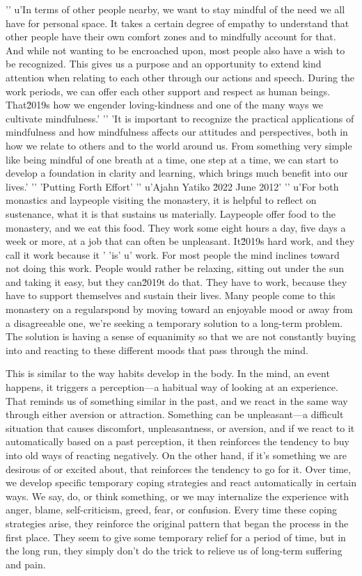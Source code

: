 '\n'
u'In terms of other people nearby, we want to stay mindful of the need we all have for personal space. It takes a certain degree of empathy to understand that other people have their own comfort zones and to mindfully account for that. And while not wanting to be encroached upon, most people also have a wish to be recognized. This gives us a purpose and an opportunity to extend kind attention when relating to each other through our actions and speech. During the work periods, we can offer each other support and respect as human beings. That\u2019s how we engender loving-kindness and one of the many ways we cultivate mindfulness.'
'\n'
'It is important to recognize the practical applications of mindfulness and how mindfulness affects our attitudes and perspectives, both in how we relate to others and to the world around us. From something very simple like being mindful of one breath at a time, one step at a time, we can start to develop a foundation in clarity and learning, which brings much benefit into our lives.'
'\n'
'Putting Forth Effort'
'\n'
u'Ajahn Yatiko \u2022 June 2012'
'\n'
u'For both monastics and laypeople visiting the monastery, it is helpful to reflect on sustenance, what it is that sustains us materially. Laypeople offer food to the monastery, and we eat this food. They work some eight hours a day, five days a week or more, at a job that can often be unpleasant. It\u2019s hard work, and they call it work because it '
'is'
u' work. For most people the mind inclines toward not doing this work. People would rather be relaxing, sitting out under the sun and taking it easy, but they can\u2019t do that. They have to work, because they have to support themselves and sustain their lives. Many people come to this monastery on a regularspond by 
moving toward an enjoyable mood or away from a disagreeable one, we're 
seeking a temporary solution to a long-term problem. The solution is 
having a sense of equanimity so that we are not constantly buying into 
and reacting to these different moods that pass through the mind.

This is similar to the way habits develop in the body. In the mind, an 
event happens, it triggers a perception---a habitual way of looking at 
an experience. That reminds us of something similar in the past, and we 
react in the same way through either aversion or attraction. Something 
can be unpleasant---a difficult situation that causes discomfort, 
unpleasantness, or aversion, and if we react to it automatically based 
on a past perception, it then reinforces the tendency to buy into old 
ways of reacting negatively. On the other hand, if it's something we 
are desirous of or excited about, that reinforces the tendency to go 
for it. Over time, we develop specific temporary coping strategies and 
react automatically in certain ways. We say, do, or think something, or 
we may internalize the experience with anger, blame, self-criticism, 
greed, fear, or confusion. Every time these coping strategies arise, 
they reinforce the original pattern that began the process in the first 
place. They seem to give some temporary relief for a period of time, 
but in the long run, they simply don't do the trick to relieve us of 
long-term suffering and pain.


